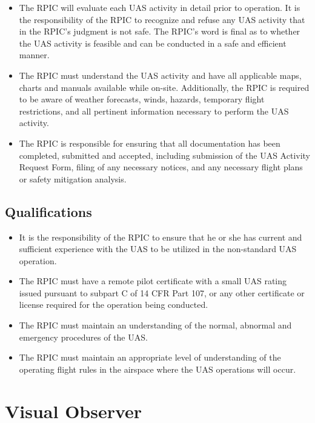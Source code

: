 \documentclass[
]{book}
\providecommand{\tightlist}{%
  \setlength{\itemsep}{0pt}\setlength{\parskip}{0pt}}
\begin{document}
\begin{itemize}
\tightlist
\item
  The RPIC will evaluate each UAS activity in detail prior to operation. It is the responsibility of the RPIC to recognize and refuse any UAS activity that in the RPIC's judgment is not safe. The RPIC's word is final as to whether the UAS activity is feasible and can be conducted in a safe and efficient manner.
\item
  The RPIC must understand the UAS activity and have all applicable maps, charts and manuals available while on-site. Additionally, the RPIC is required to be aware of weather forecasts, winds, hazards, temporary flight restrictions, and all pertinent information necessary to perform the UAS activity.
\item
  The RPIC is responsible for ensuring that all documentation has been completed, submitted and accepted, including submission of the UAS Activity Request Form, filing of any necessary notices, and any necessary flight plans or safety mitigation analysis.
\end{itemize}

\hypertarget{qualifications}{%
\subsection{Qualifications}\label{qualifications}}

\begin{itemize}
\tightlist
\item
  It is the responsibility of the RPIC to ensure that he or she has current and sufficient experience with the UAS to be utilized in the non-standard UAS operation.
\item
  The RPIC must have a remote pilot certificate with a small UAS rating issued pursuant to subpart C of 14 CFR Part 107, or any other certificate or license required for the operation being conducted.
\item
  The RPIC must maintain an understanding of the normal, abnormal and emergency procedures of the UAS.
\item
  The RPIC must maintain an appropriate level of understanding of the operating flight rules in the airspace where the UAS operations will occur.
\end{itemize}

\hypertarget{visual-observer}{%
\section{Visual Observer}\label{visual-observer}}
\end{document}
